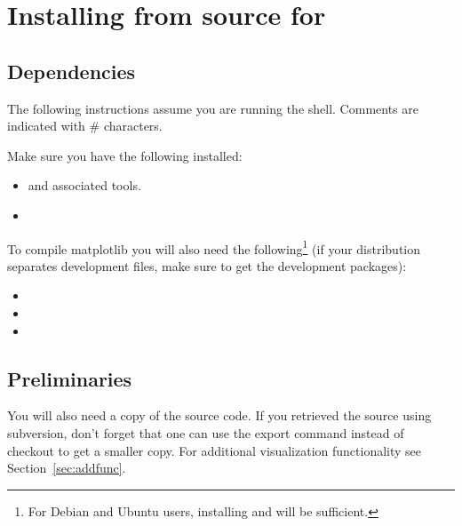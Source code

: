 %
%
%

\section{Installing from source for \linux}
\label{sec:srclinux}

\subsection{Dependencies}

The following instructions assume you are running the  shell.
Comments are indicated with \# characters.

Make sure you have the following installed:
\begin{itemize}
 \item {} and associated tools.
 \item {}
\end{itemize}

To compile matplotlib you will also need the following\footnote{For Debian and Ubuntu users, installing  and  will be sufficient.} (if your distribution separates development files,
make sure to get the development packages):
\begin{itemize}
 \item {}
\item {}
\item {}
\end{itemize}


\subsection{Preliminaries}
\label{sec:prelim}
You will also need a copy of the \esfinley source code.
If you retrieved the source using subversion, don't forget that one can use the export command instead of checkout to get a smaller copy.
For additional visualization functionality see Section~\ref{sec:addfunc}.

